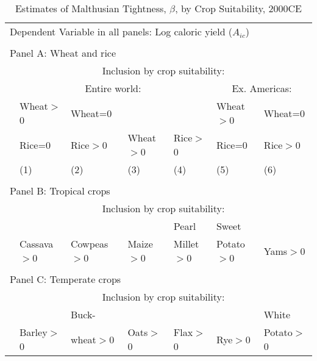 \documentclass[11pt]{article}
\begin{document}
\clearpage
\begin{table}[!htb]
\begin{center}
\caption{Estimates of Malthusian Tightness, $\beta$, by Crop Suitability, 2000CE}
\label{TAB_beta_crops}
{\footnotesize
\begin{tabularx}{\textwidth}{lXXXXXX}
\midrule
\multicolumn{7}{l}{Dependent Variable in all panels: Log caloric yield ($A_{ic}$)} \\ \\
\multicolumn{7}{l}{Panel A: Wheat and rice} \\
 & \multicolumn{6}{c}{Inclusion by crop suitability:} \\ \cmidrule(lr){2-7}
 & \multicolumn{4}{c}{Entire world:} & \multicolumn{2}{c}{Ex. Americas:}\\ \cmidrule(lr){2-5} \cmidrule(lr){6-7} 
 & Wheat$>$0& Wheat=0 &         &        & Wheat$>$0   & Wheat=0   \\
 & Rice=0 & Rice$>$0  & Wheat$>$0 & Rice$>$0 & Rice=0    & Rice$>$0   \\
 & (1) & (2) & (3) & (4) & (5) & (6) \\
\midrule

\midrule
\\
\multicolumn{7}{l}{Panel B: Tropical crops} \\
                   & \multicolumn{6}{c}{Inclusion by crop suitability:} \\ \cmidrule(lr){2-7}
                   &            &              &          &   Pearl       &  Sweet      & \\
& Cassava$>$0 & Cowpeas$>$0  & Maize$>$0 & Millet$>$0 & Potato$>$0 & Yams$>$0   \\
\midrule

\midrule
\\
\multicolumn{7}{l}{Panel C: Temperate crops} \\
                   & \multicolumn{6}{c}{Inclusion by crop suitability:} \\ \cmidrule(lr){2-7}
                   &            & Buck-        &          &          &         & White \\
                   & Barley$>$0 & wheat$>$0  & Oats$>$0 & Flax$>$0 & Rye$>$0 & Potato$>$0   \\
\midrule

\midrule
\end{tabularx}
}
\end{center}
\vspace{-.5cm}
\end{table}
\end{document}
